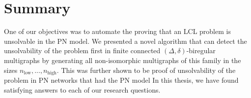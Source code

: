 
\section{Summary} \label{sec:summary}

One of our objectives was to automate the proving that an LCL problem is unsolvable in the PN model.
We presented a novel algorithm that can detect the unsolvability of the problem first in finite connected $(\Delta, \delta)$-biregular multigraphs by generating all non-isomorphic multigraphs of this family in the sizes $n_\text{low}, ..., n_\text{high}$.
This was further shown to be proof of unsolvability of the problem in PN networks that had the PN model
\todo{}
In this thesis, we have found satisfying answers to each of our research questions.
